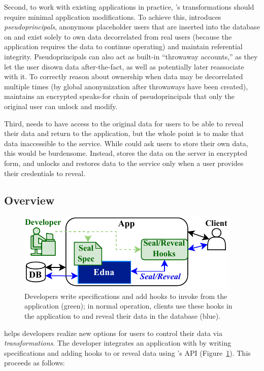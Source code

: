 %
Second, to work with existing applications in practice, \sys's \xxing
transformations should require minimal application modifications.
%
To achieve this, \sys introduces \emph{pseudoprincipals}, anonymous placeholder
users that are inserted into the database on \xxing and exist solely to own data
decorrelated from real users (\eg because the application requires the data to
continue operating) and maintain referential integrity.
%
Pseudoprincipals can also act as built-in ``throwaway accounts,'' as they let
the user disown data after-the-fact, as well as potentially later reassociate
with it.
%
To correctly reason about ownership when data may be decorrelated multiple times
(\eg by global anonymization after throwaways have been created), \sys maintains
an encrypted speaks-for chain of pseudoprincipals that only the original user
can unlock and modify.
%

%
Third, \sys needs to have access to the original data for users to be able to
reveal their data and return to the application, but the whole point is to make
that data inaccessible to the service.
%
While \sys could ask users to store their own \xxed data, this would be
burdensome.
%
Instead, \sys stores the \xxed data on the server in encrypted form, and unlocks
and restores data to the service only when a user provides their credentials to
reveal.
%

\subsection{\sys Overview}

\begin{figure}[t!]
  \centering
    \includegraphics{figs/edna_overview}
    \caption{Developers write \xx specifications and add hooks to invoke \sys
        from the application (green); in normal operation, clients use these
        hooks in the application to \xx and reveal their data in the database
        (blue).
    }
  \label{f:edna-overview}
\end{figure}
%
\sys helps developers realize new options for users to control their data
via \emph{\xxing transformations}.
%
The developer integrates an application with \sys by writing \xx specifications
and adding hooks to \xx or reveal data using \sys's API
(Figure~\ref{f:edna-overview}).
%
This proceeds as follows:
%

